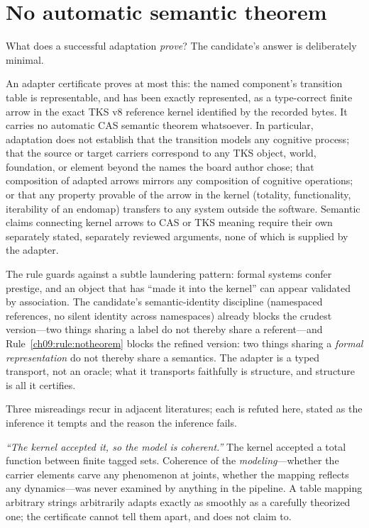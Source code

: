 \section{No automatic semantic theorem}\label{ch09:sec:notheorem}

What does a successful adaptation \emph{prove}? The candidate's answer is deliberately minimal.

\begin{ruleenv}\label{ch09:rule:notheorem}
An adapter certificate proves at most this: the named component's transition table is representable, and has been exactly represented, as a type-correct finite arrow in the exact TKS v8 reference kernel identified by the recorded bytes. It carries no automatic CAS semantic theorem whatsoever. In particular, adaptation does not establish that the transition models any cognitive process; that the source or target carriers correspond to any TKS object, world, foundation, or element beyond the names the board author chose; that composition of adapted arrows mirrors any composition of cognitive operations; or that any property provable of the arrow in the kernel (totality, functionality, iterability of an endomap) transfers to any system outside the software. Semantic claims connecting kernel arrows to CAS or TKS meaning require their own separately stated, separately reviewed arguments, none of which is supplied by the adapter.
\end{ruleenv}

The rule guards against a subtle laundering pattern: formal systems confer prestige, and an object that has ``made it into the kernel'' can appear validated by association. The candidate's semantic-identity discipline (namespaced references, no silent identity across namespaces) already blocks the crudest version---two things sharing a label do not thereby share a referent---and Rule~\ref{ch09:rule:notheorem} blocks the refined version: two things sharing a \emph{formal representation} do not thereby share a semantics. The adapter is a typed transport, not an oracle; what it transports faithfully is structure, and structure is all it certifies.

Three misreadings recur in adjacent literatures; each is refuted here, stated as the inference it tempts and the reason the inference fails.

\emph{``The kernel accepted it, so the model is coherent.''} The kernel accepted a total function between finite tagged sets. Coherence of the \emph{modeling}---whether the carrier elements carve any phenomenon at joints, whether the mapping reflects any dynamics---was never examined by anything in the pipeline. A table mapping arbitrary strings arbitrarily adapts exactly as smoothly as a carefully theorized one; the certificate cannot tell them apart, and does not claim to.

